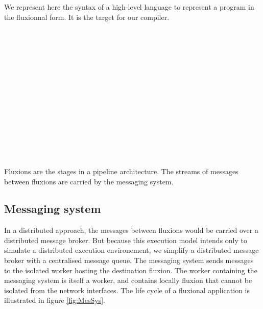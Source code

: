 We represent here the syntax of a high-level language to represent a program in the fluxionnal form.
It is the target for our compiler.

\begin{bnf*}
      { \bnfor {} \bnfsp {} \bnfsp {}}\\
          { \bnfsp {} \bnfsp {} \bnfsp {} \bnfsp {} \bnfsp {} \bnfsp {} \bnfsp {}}\\
       { \bnfsp {} \bnfor {}}\\
      { \bnfor {} \bnfor {} \bnfsp {} \bnfsp {}}\\
       { \bnfsp {} }\\
         {}\\
          {\bnfts{\texttt{\{}}  \bnfts{\texttt{\}}}}\\
          {\bnfts{\texttt{[}}  \bnfts{\texttt{]}}}\\
         { \bnfor {} \bnfsp \bnfts{,} \bnfsp {}}\\
           {\bnfts{\texttt{>}\texttt{>}} \bnfor \bnfts{\texttt{-}\texttt{>}}}\\
           {}\\
           {}\\
\end{bnf*}
\vspace{-1.5\baselineskip}~\\

Fluxions are the stages in a pipeline architecture.
The streams of messages between fluxions are carried by the messaging system.

\subsection{Messaging system}

In a distributed approach, the messages between fluxions would be carried over a distributed message broker.
But because this execution model intends only to simulate a distributed execution environement, we simplify a distributed message broker with a centralised message queue.
The messaging system sends messages to the isolated worker hosting the destination fluxion.
The worker containing the messaging system is itself a worker, and contains locally fluxion that cannot be isolated from the network interfaces.
The life cycle of a fluxional application is illustrated in figure \ref{fig:MesSys}.

